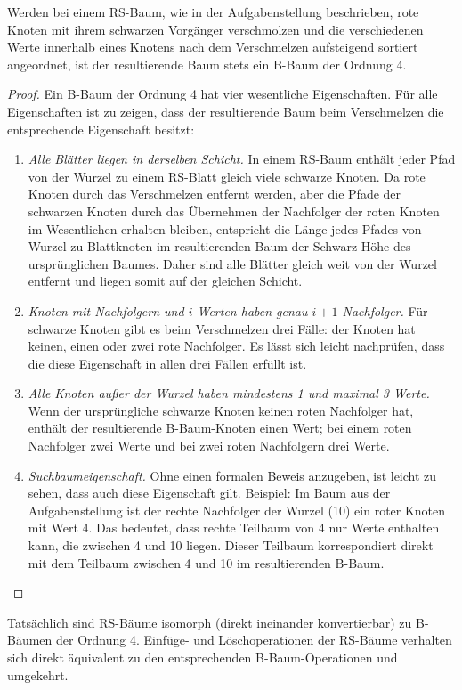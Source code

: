 \documentclass[11pt,a4paper]{article}
\begin{document}
\begin{loesung}
\begin{enumerate}[label=\alph*)]
        Werden bei einem RS-Baum, wie in der Aufgabenstellung beschrieben, rote Knoten mit ihrem schwarzen Vorgänger verschmolzen und die verschiedenen Werte innerhalb eines Knotens nach dem Verschmelzen aufsteigend sortiert angeordnet, ist der resultierende Baum stets ein B-Baum der Ordnung 4.
        \begin{proof}
            Ein B-Baum der Ordnung 4 hat vier wesentliche Eigenschaften.
            Für alle Eigenschaften ist zu zeigen, dass der resultierende Baum beim Verschmelzen die entsprechende Eigenschaft besitzt:
            \begin{enumerate}[label=\arabic*.]
                \item \emph{Alle Blätter liegen in derselben Schicht.}
                In einem RS-Baum enthält jeder Pfad von der Wurzel zu einem RS-Blatt gleich viele schwarze Knoten.
                Da rote Knoten durch das Verschmelzen entfernt werden, aber die Pfade der schwarzen Knoten durch das Übernehmen der Nachfolger der roten Knoten im Wesentlichen erhalten bleiben, entspricht die Länge jedes Pfades von Wurzel zu Blattknoten im resultierenden Baum der Schwarz-Höhe des ursprünglichen Baumes.
                Daher sind alle Blätter gleich weit von der Wurzel entfernt und liegen somit auf der gleichen Schicht.
                \item \emph{Knoten mit Nachfolgern und $i$ Werten haben genau $i + 1$ Nachfolger.}
                Für schwarze Knoten gibt es beim Verschmelzen drei Fälle: der Knoten hat keinen, einen oder zwei rote Nachfolger.
                Es lässt sich leicht nachprüfen, dass die diese Eigenschaft in allen drei Fällen erfüllt ist.
                \item \emph{Alle Knoten außer der Wurzel haben mindestens 1 und maximal 3 Werte.}
                Wenn der ursprüngliche schwarze Knoten keinen roten Nachfolger hat, enthält der resultierende B-Baum-Knoten einen Wert; bei einem roten Nachfolger zwei Werte und bei zwei roten Nachfolgern drei Werte.
                \item \emph{Suchbaumeigenschaft.}
                Ohne einen formalen Beweis anzugeben, ist leicht zu sehen, dass auch diese Eigenschaft gilt.
                Beispiel: Im Baum aus der Aufgabenstellung ist der rechte Nachfolger der Wurzel (10) ein roter Knoten mit Wert 4.
                Das bedeutet, dass rechte Teilbaum von 4 nur Werte enthalten kann, die zwischen 4 und 10 liegen.
                Dieser Teilbaum korrespondiert direkt mit dem Teilbaum zwischen 4 und 10 im resultierenden B-Baum.
            \end{enumerate}
        \end{proof}
        Tatsächlich sind RS-Bäume isomorph (direkt ineinander konvertierbar) zu B-Bäumen der Ordnung 4. 
        Einfüge- und Löschoperationen der RS-Bäume verhalten sich direkt äquivalent zu den entsprechenden B-Baum-Operationen und umgekehrt.
    \end{enumerate}
\end{loesung}
\end{document}
